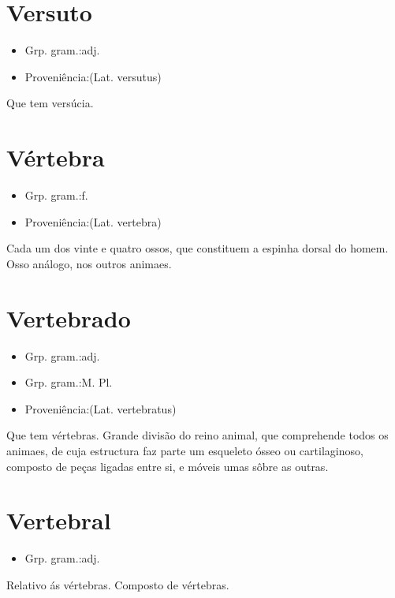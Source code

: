 \documentclass{article}
\begin{document}
\section{Versuto}
\begin{itemize}
\item {Grp. gram.:adj.}
\end{itemize}
\begin{itemize}
\item {Proveniência:(Lat. \textunderscore versutus\textunderscore )}
\end{itemize}
Que tem versúcia.
\section{Vértebra}
\begin{itemize}
\item {Grp. gram.:f.}
\end{itemize}
\begin{itemize}
\item {Proveniência:(Lat. \textunderscore vertebra\textunderscore )}
\end{itemize}
Cada um dos vinte e quatro ossos, que constituem a espinha dorsal do homem.
Osso análogo, nos outros animaes.
\section{Vertebrado}
\begin{itemize}
\item {Grp. gram.:adj.}
\end{itemize}
\begin{itemize}
\item {Grp. gram.:M. Pl.}
\end{itemize}
\begin{itemize}
\item {Proveniência:(Lat. \textunderscore vertebratus\textunderscore )}
\end{itemize}
Que tem vértebras.
Grande divisão do reino animal, que comprehende todos os animaes, de cuja estructura faz parte um esqueleto ósseo ou cartilaginoso, composto de peças ligadas entre si, e móveis umas sôbre as outras.
\section{Vertebral}
\begin{itemize}
\item {Grp. gram.:adj.}
\end{itemize}
Relativo ás vértebras.
Composto de vértebras.
\end{document}
